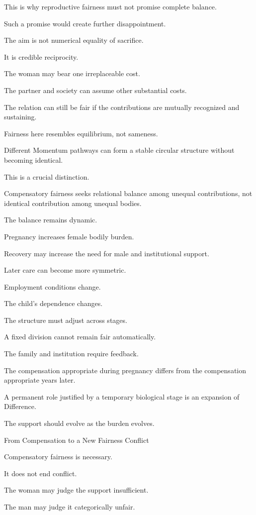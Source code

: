 This is why reproductive fairness must not promise complete balance.

Such a promise would create further disappointment.

The aim is not numerical equality of sacrifice.

It is credible reciprocity.

The woman may bear one irreplaceable cost.

The partner and society can assume other substantial costs.

The relation can still be fair if the contributions are mutually recognized and sustaining.

Fairness here resembles equilibrium, not sameness.

Different Momentum pathways can form a stable circular structure without becoming identical.

This is a crucial distinction.

Compensatory fairness seeks relational balance among unequal contributions, not identical contribution among unequal bodies.

The balance remains dynamic.

Pregnancy increases female bodily burden.

Recovery may increase the need for male and institutional support.

Later care can become more symmetric.

Employment conditions change.

The child’s dependence changes.

The structure must adjust across stages.

A fixed division cannot remain fair automatically.

The family and institution require feedback.

The compensation appropriate during pregnancy differs from the compensation appropriate years later.

A permanent role justified by a temporary biological stage is an expansion of Difference.

The support should evolve as the burden evolves.

From Compensation to a New Fairness Conflict

Compensatory fairness is necessary.

It does not end conflict.

The woman may judge the support insufficient.

The man may judge it categorically unfair.

